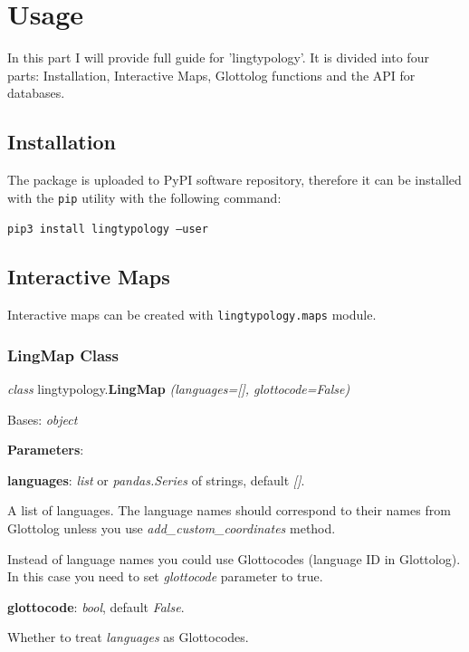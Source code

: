 \documentclass[a4paper,12pt]{article}
\begin{document}
\newpage

\section{Usage}
In this part I will provide full guide for 'lingtypology'. It is divided into four parts: Installation, Interactive Maps, Glottolog functions and the API for databases.

\subsection{Installation}
The package is uploaded to PyPI software repository, therefore it can be installed with the \texttt{pip} utility with the following command:

\texttt{pip3 install lingtypology --user}

\subsection{Interactive Maps}
Interactive maps can be created with \texttt{lingtypology.maps} module.

\subsubsection{LingMap Class}

\textit{class} lingtypology.\textbf{LingMap} \textit{(languages=[], glottocode=False)}

Bases: \textit{object}

\textbf{Parameters}:
\begin{itemize}
\begin{samepage}
 \item \textbf{languages}: \textit{list} or \textit{pandas.Series} of strings, default \textit{[]}.

 A list of languages. The language names should correspond to their names from Glottolog unless you use \textit{add\_custom\_coordinates} method.
 
 Instead of language names you could use Glottocodes (language ID in Glottolog). In this case you need to set \textit{glottocode} parameter to true.
 
 \item \textbf{glottocode}: \textit{bool}, default \textit{False}.
 
 Whether to treat \textit{languages} as Glottocodes.
 
\end{samepage}
\end{itemize}
\end{document}
